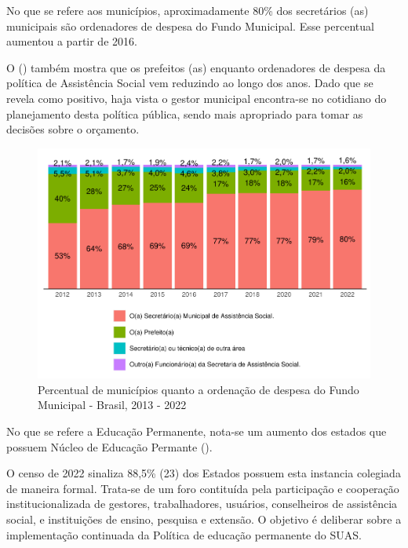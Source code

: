 \documentclass[
  brazilian]{report}
\begin{document}
No que se refere aos municípios, aproximadamente 80\% dos secretários
(as) municipais são ordenadores de despesa do Fundo Municipal. Esse
percentual aumentou a partir de 2016.

O () também mostra que os prefeitos (as)
enquanto ordenadores de despesa da política de Assistência Social vem
reduzindo ao longo dos anos. Dado que se revela como positivo, haja
vista o gestor municipal encontra-se no cotidiano do planejamento desta
política pública, sendo mais apropriado para tomar as decisões sobre o
orçamento.

\begin{figure}
\includegraphics{Censo-SUAS-2022_files/figure-latex/munic_ord_despesa-1} \caption[Percentual de municípios quanto a ordenação de despesa do Fundo Municipal - Brasil, 2013 - 2022]{Percentual de municípios quanto a ordenação de despesa do Fundo Municipal - Brasil, 2013 - 2022}\label{fig:munic_ord_despesa}
\end{figure}

No que se refere a Educação Permanente, nota-se um aumento dos estados
que possuem Núcleo de Educação Permante ().

O censo de 2022 sinaliza 88,5\% (23) dos Estados possuem esta instancia
colegiada de maneira formal. Trata-se de um foro contituída pela
participação e cooperação institucionalizada de gestores, trabalhadores,
usuários, conselheiros de assistência social, e instituições de ensino,
pesquisa e extensão. O objetivo é deliberar sobre a implementação
continuada da Política de educação permanente do SUAS.
\end{document}

